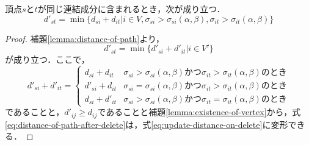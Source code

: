 \begin{lemma}
  \label{lemma:update-distance-on-delete}
  頂点$s$と$t$が同じ連結成分に含まれるとき，次が成り立つ．
  \begin{equation}
    d'_{st}=\min\{d_{si}+d_{it}|i\in V,\sigma_{si}>\sigma_{si}(\alpha,\beta),\sigma_{it}>\sigma_{it}(\alpha,\beta)\}
    \label{eq:update-distance-on-delete}
  \end{equation}
\end{lemma}
\begin{proof}
  補題\ref{lemma:distance-of-path}より，
  \begin{equation}
    d'_{st}=\min\{d'_{si}+d'_{it}|i\in V'\}
    \label{eq:distance-of-path-after-delete}
  \end{equation}
  が成り立つ．ここで，
  \begin{equation*}
    d'_{si}+d'_{it}=
    \begin{cases}
      d_{si}+d_{it} & \sigma_{si}>\sigma_{si}(\alpha,\beta)\textrm{かつ}\sigma_{it}>\sigma_{it}(\alpha,\beta)のとき \\
      d'_{si}+d_{it} & \sigma_{si}=\sigma_{si}(\alpha,\beta)\textrm{かつ}\sigma_{it}>\sigma_{it}(\alpha,\beta)のとき \\
      d_{si}+d'_{it} & \sigma_{si}>\sigma_{si}(\alpha,\beta)\textrm{かつ}\sigma_{it}=\sigma_{it}(\alpha,\beta)のとき
    \end{cases}
  \end{equation*}
  であることと，$d'_{ij}\geq d_{ij}$であることと補題\ref{lemma:existence-of-vertex}から，式\eqref{eq:distance-of-path-after-delete}は，式\eqref{eq:update-distance-on-delete}に変形できる．
\end{proof}

